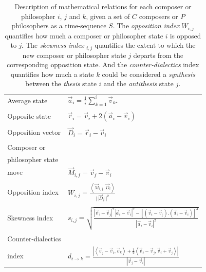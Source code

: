 \documentclass[
 aip,
 jmp,
 amsmath,amssymb,
 reprint,
]{revtex4-1}
\begin{document}
\begin{table}
  \caption{\label{tab:tableRelations}Description of mathematical
    relations for each composer or philosopher $i$, $j$ and $k$, given
    a set of $C$ composers or $P$ philosophers as a time-sequence $S$.
    The \emph{opposition index} $W_{i,j}$ quantifies how much a
    composer or philosopher state $i$ is opposed to $j$. The
    \emph{skewness index} $_{i,j}$ quantifies the extent to which the
    new composer or philosopher state $j$ departs from the
    corresponding opposition state. And the \emph{counter-dialectics}
    index quantifies how much a state $k$ could be considered a
    \emph{synthesis} between the \emph{thesis} state $i$ and the
    \emph{antithesis} state $j$.}

  \begin{ruledtabular}
    \begin{tabular}{ll}
      \\ 
      Average state      & $\vec{a}_i = \frac{1}{i}\sum_{k=1}^i\vec{v}_k.$ 
      \\ \\
      Opposite state     & $\vec{r}_i = \vec{v}_i + 2(\vec{a}_i - \vec{v}_i)$ 
      \\ \\
      Opposition vector  & $\vec{D}_i=\vec{r}_i - \vec{v}_i$ 
      \\ \\
      Composer or \\ 
      philosopher state \\move & $\vec{M}_{i,j} = \vec{v}_j - \vec{v}_i$ 
      \\ \\
      Opposition index  & $W_{i,j} = \frac{\left< \vec{M}_{i,j}, \vec{D}_i\right>}
      {||\vec{D}_i||^2}$ 
      \\ \\
      Skewness index     & $s_{i,j} = \sqrt{\frac{|\vec{v}_i-\vec{v}_j|^2
          |\vec{a}_i-\vec{v}_i|^2 - 
          [(\vec{v}_i-\vec{v}_j) . 
            (\vec{a}_i-\vec{v}_i)]^2}
        {|\vec{a}_i-\vec{v}_i|^2}}$ 
      \\ \\
      Counter-dialectics \\ 
      index              & $d_{i \rightarrow k} = 
      \frac{|\left< \vec{v}_j-\vec{v}_i,\vec{v}_k \right> + 
        \frac{1}{2}\left<\vec{v}_i-\vec{v}_j, \vec{v}_i+\vec{v}_j\right>|}
           {|\vec{v}_j-\vec{v}_i|}$
           \\
    \end{tabular}
  \end{ruledtabular}
\end{table}
\end{document}
